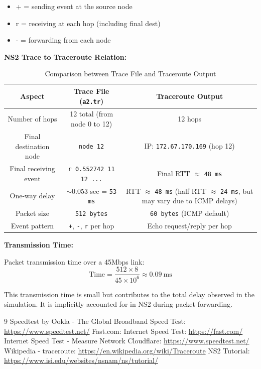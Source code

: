 \documentclass[12pt]{article}
\begin{document}
	\begin{itemize}

	\item + = sending event at the source node
	
	\item r = receiving at each hop (including final dest)
	
	\item - = forwarding from each node
	\end{itemize}
	
		\textbf{NS2 Trace to Traceroute Relation:}
	
	\begin{table}[H]
		\centering
		\begin{tabular}{|c|c|c|}
			\hline
			Aspect & Trace File (\texttt{a2.tr}) & Traceroute Output \\
			\hline
			Number of hops & 12 total (from node 0 to 12) & 12 hops \\
			\hline
			Final destination node & \texttt{node 12} & IP: \texttt{172.67.170.169} (hop 12) \\
			\hline
			Final receiving event & \texttt{r 0.552742 11 12 ...} & Final RTT $\approx$ \texttt{48 ms} \\
			\hline
			One-way delay & $\sim$0.053 sec = \texttt{53 ms} & RTT $\approx$ \texttt{48 ms} (half RTT $\approx$ \texttt{24 ms}, but may vary due to ICMP delays) \\
			\hline
			Packet size & \texttt{512 bytes} & \texttt{60 bytes} (ICMP default) \\
			\hline
			Event pattern & \texttt{+}, \texttt{-}, \texttt{r} per hop & Echo request/reply per hop \\
			\hline
		\end{tabular}
		\caption{Comparison between Trace File and Traceroute Output}
		\label{tab:comparison}
	\end{table}
	
	
	\noindent
	\textbf{Transmission Time:}
	
	\noindent
	Packet transmission time over a 45Mbps link:
	\[
	\text{Time} = \frac{512 \times 8}{45 \times 10^6} \approx 0.09~\mathrm{ms}
	\]
	
	\noindent
	This transmission time is small but contributes to the total delay observed in the simulation. It is implicitly accounted for in NS2 during packet forwarding.
	
	
	\begin{thebibliography}{9}
		 Speedtest by Ookla - The Global Broadband Speed Test: \url{https://www.speedtest.net/}
		 Fast.com: Internet Speed Test:
		\url{https://fast.com/}
		 Internet Speed Test - Measure Network Cloudflare: \url{https://www.speedtest.net/}
		 Wikipedia - traceroute:
		\url{https://en.wikipedia.org/wiki/Traceroute}
		 NS2 Tutorial:
		\url{https://www.isi.edu/websites/nsnam/ns/tutorial/}
	\end{thebibliography}
	
\end{document}
